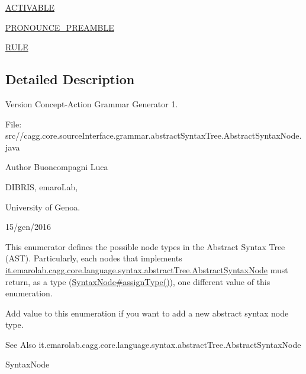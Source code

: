 \begin{DoxyCompactItemize}
\item 
\hyperlink{enumit_1_1emarolab_1_1cagg_1_1core_1_1language_1_1syntax_1_1abstractTree_1_1AbstractSyntaxNode_3f088e462016145511ce70dc364c19523_adaf17e016fe239e14583c66b2d4f77e4}{A\-C\-T\-I\-V\-A\-B\-L\-E}
\item 
\hyperlink{enumit_1_1emarolab_1_1cagg_1_1core_1_1language_1_1syntax_1_1abstractTree_1_1AbstractSyntaxNode_3f088e462016145511ce70dc364c19523_aeb4eb6ada0429e2611eb36ab9e4b9c35}{P\-R\-O\-N\-O\-U\-N\-C\-E\-\_\-\-P\-R\-E\-A\-M\-B\-L\-E}
\item 
\hyperlink{enumit_1_1emarolab_1_1cagg_1_1core_1_1language_1_1syntax_1_1abstractTree_1_1AbstractSyntaxNode_3f088e462016145511ce70dc364c19523_a171d3235b9c43c5f0a3dbce61b2a96b5}{R\-U\-L\-E}
\end{DoxyCompactItemize}


\subsection{Detailed Description}
\begin{DoxyVersion}{Version}
Concept-\/\-Action Grammar Generator 1. \par
 File\-: src//cagg.core.\-source\-Interface.\-grammar.\-abstract\-Syntax\-Tree.\-Abstract\-Syntax\-Node.\-java \par

\end{DoxyVersion}
\begin{DoxyAuthor}{Author}
Buoncompagni Luca \par
 D\-I\-B\-R\-I\-S, emaro\-Lab,\par
 University of Genoa. \par
 15/gen/2016 \par

\end{DoxyAuthor}


This enumerator defines the possible node types in the Abstract Syntax Tree (A\-S\-T). Particularly, each nodes that implements \hyperlink{}{it.\-emarolab.\-cagg.\-core.\-language.\-syntax.\-abstract\-Tree.\-Abstract\-Syntax\-Node} must return, as a type (\hyperlink{}{Syntax\-Node\#assign\-Type()}), one different value of this enumeration.\par
 Add value to this enumeration if you want to add a new abstract syntax node type. 

\begin{DoxySeeAlso}{See Also}
it.\-emarolab.\-cagg.\-core.\-language.\-syntax.\-abstract\-Tree.\-Abstract\-Syntax\-Node 

Syntax\-Node 
\end{DoxySeeAlso}


